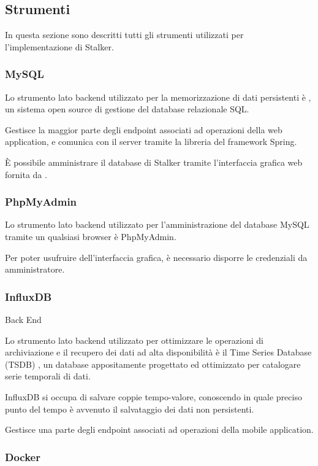 \documentclass[../../../manuale-manutentore.tex]{subfiles}
\begin{document}
\subsection{Strumenti}%
\label{sub:strumenti}
In questa sezione sono descritti tutti gli strumenti utilizzati per l'implementazione di Stalker.

\subsubsection{MySQL}%
\label{subs:mysql}
Lo strumento lato backend utilizzato per la memorizzazione di dati persistenti è , un sistema open source di gestione del database relazionale SQL\@.

Gestisce la maggior parte degli endpoint associati ad operazioni della web application, e comunica con il server tramite la libreria  del framework Spring.

È possibile amministrare il database di Stalker tramite l'interfaccia grafica web fornita da .

\subsubsection{PhpMyAdmin}%
\label{subs:phpmyadmin}

Lo strumento lato backend utilizzato per l'amministrazione del database MySQL tramite un qualsiasi browser è PhpMyAdmin.

Per poter usufruire dell'interfaccia grafica, è necessario disporre le credenziali da amministratore.

\subsubsection{InfluxDB}%
\label{subs:influxdb}
Back End

Lo strumento lato backend utilizzato per ottimizzare le operazioni di archiviazione e il recupero dei dati ad alta disponibilità è il Time Series Database (TSDB) , un database appositamente progettato ed ottimizzato per catalogare serie temporali di dati.

InfluxDB si occupa di salvare coppie tempo-valore, conoscendo in quale preciso punto del tempo è avvenuto il salvataggio dei dati non persistenti.

Gestisce una parte degli endpoint associati ad operazioni della mobile application.

\subsubsection{Docker}%
\label{subs:docker}
\end{document}

